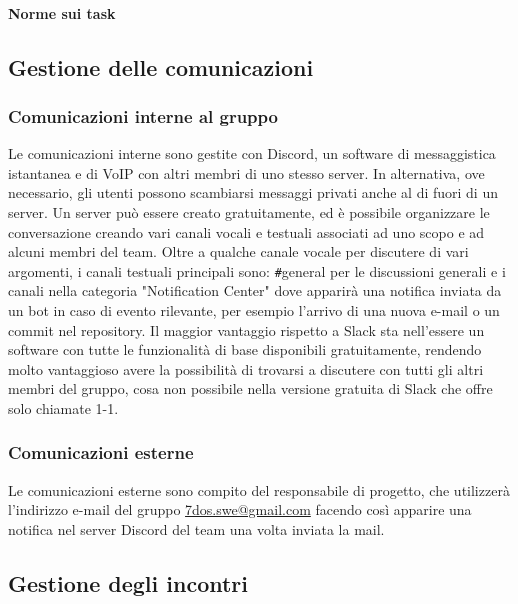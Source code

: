 \paragraph{Norme sui task} \Spazio

\subsection{Gestione delle comunicazioni}
\subsubsection{Comunicazioni interne al gruppo}
Le comunicazioni interne sono gestite con Discord, un software di messaggistica istantanea e di VoIP con altri membri di uno stesso server. In alternativa, ove necessario, gli utenti possono scambiarsi messaggi privati anche al di fuori di un server.
Un server può essere creato gratuitamente, ed è possibile organizzare le conversazione creando vari canali vocali e testuali associati ad uno scopo e ad alcuni membri del team.\newline
Oltre a qualche canale vocale per discutere di vari argomenti, i canali testuali principali sono: \verb|#|general per le discussioni generali e i canali nella categoria "Notification Center" dove apparirà una notifica inviata da un bot in caso di evento rilevante, per esempio l'arrivo di una nuova e-mail o un commit nel repository.
\newline
Il maggior vantaggio rispetto a Slack sta nell'essere un software con tutte le funzionalità di base disponibili gratuitamente, rendendo molto vantaggioso avere la possibilità di trovarsi a discutere con tutti gli altri membri del gruppo, cosa non possibile nella versione gratuita di Slack che offre solo chiamate 1-1.

\subsubsection{Comunicazioni esterne}
Le comunicazioni esterne sono compito del responsabile di progetto, che utilizzerà l'indirizzo e-mail del gruppo \href{mailto:7dos.swe@gmail.com}{7dos.swe@gmail.com} facendo così apparire una notifica nel server Discord del team una volta inviata la mail.

\subsection{Gestione degli incontri}
